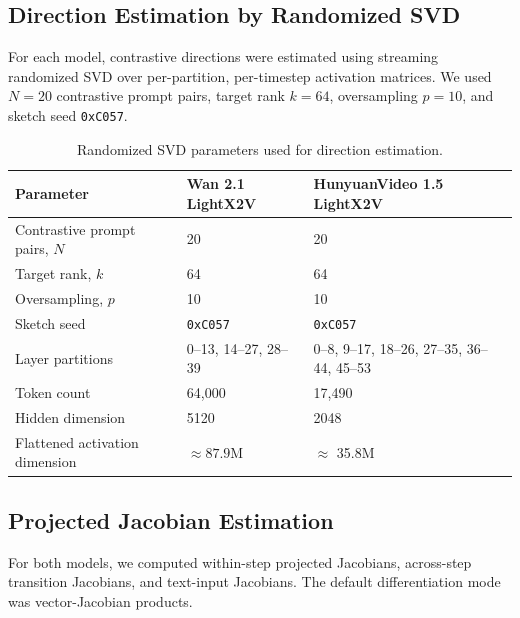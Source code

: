 \documentclass{article}
\begin{document}
\subsection{Direction Estimation by Randomized SVD}

For each model, contrastive directions were estimated using streaming randomized SVD over per-partition, per-timestep activation matrices. We used $N=20$ contrastive prompt pairs, target rank $k=64$, oversampling $p=10$, and sketch seed \texttt{0xC057}.

\begin{table}[h]
\centering
\caption{Randomized SVD parameters used for direction estimation.}
\label{tab:svd_parameters}
\begin{tabular}{lll}
\hline
\textbf{Parameter} & \textbf{Wan 2.1 LightX2V} & \textbf{HunyuanVideo 1.5 LightX2V} \\
\hline
Contrastive prompt pairs, $N$ & 20 & 20 \\
Target rank, $k$ & 64 & 64 \\
Oversampling, $p$ & 10 & 10 \\
Sketch seed & \texttt{0xC057} & \texttt{0xC057} \\
Layer partitions & 0--13, 14--27, 28--39 & 0--8, 9--17, 18--26, 27--35, 36--44, 45--53 \\
Token count & 64{,}000 & 17{,}490 \\
Hidden dimension & 5120 & 2048 \\
Flattened activation dimension & $\approx 87.9$M & $\approx$ 35.8M \\
\hline
\end{tabular}
\end{table}

\subsection{Projected Jacobian Estimation}

For both models, we computed within-step projected Jacobians, across-step transition Jacobians, and text-input Jacobians. The default differentiation mode was vector-Jacobian products.
\end{document}
